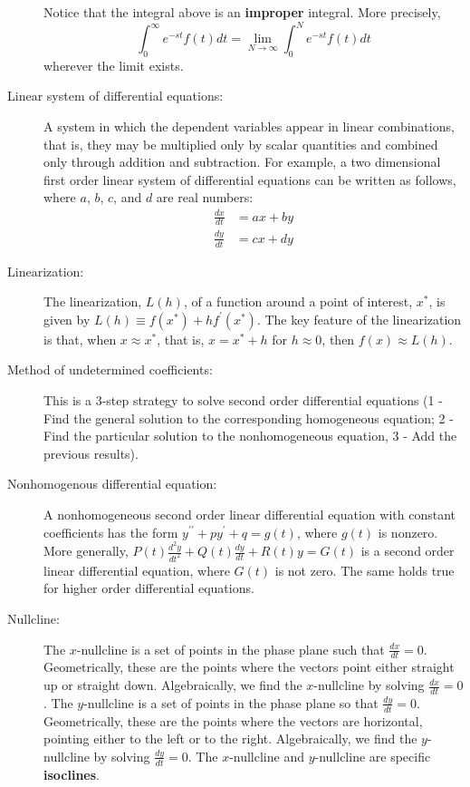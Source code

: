 \begin{description}
Notice that the integral above is an \textbf{improper} integral. More precisely,
\[
\int_0^\infty e^{-st}f(t)dt=\lim_{N\to\infty} \int_0^N e^{-st}f(t)dt
\]
wherever the limit exists. \\
\item[Linear system of differential equations:] A system in which the dependent variables appear in linear combinations, that is, they may be multiplied only by scalar quantities and combined only through addition and subtraction. For example, a two dimensional first order linear system of differential equations can be written as follows, where $a$, $b$, $c$, and $d$ are real numbers:
\begin{align*}
\frac{dx}{dt} &= ax + by \\
\frac{dy}{dt} &= cx + dy
\end{align*}
\item[Linearization:] The linearization, $L(h)$, of a function around a point of interest, $x^*$, is given by $L(h) \equiv f(x^*) + hf^\prime(x^*)$. The key feature of the linearization is that, when $x \approx x^*$, that is, $x = x^* + h$ for $h \approx 0$, then $f(x) \approx L(h)$.
\item[Method of undetermined coefficients:] This is a 3-step strategy to solve second order differential equations (1 - Find the general solution to the corresponding homogeneous equation; 2 - Find the particular solution to the nonhomogeneous equation, 3 - Add the previous results).
\item[Nonhomogenous differential equation:] A nonhomogeneous second order linear differential equation with constant coefficients has the form $y^{\prime\prime}+py^\prime+q=g(t)$, where $g(t)$ is nonzero. More generally, $P(t)\frac{d^2y}{dt^2}+Q(t)\frac{dy}{dt}+R(t)y=G(t)$ is a second order linear differential equation, where $G(t)$ is not zero. The same holds true for higher order differential equations.
\item[Nullcline:] The $x$-nullcline is a set of points in the phase plane such that $\frac{dx}{dt} = 0$. Geometrically, these are the points where the vectors point either straight up or straight down. Algebraically, we find the $x$-nullcline by solving $\frac{dx}{dt} = 0$. The $y$-nullcline is a set of points in the phase plane so that $\frac{dy}{dt} = 0$. Geometrically, these are the points where the vectors are horizontal, pointing either to the left or to the right. Algebraically, we find the $y$-nullcline by solving $\frac{dy}{dt} = 0$. The $x$-nullcline and $y$-nullcline are specific \textbf{isoclines}.

\end{description}
